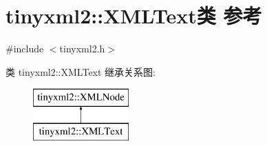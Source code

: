 \hypertarget{classtinyxml2_1_1_x_m_l_text}{}\section{tinyxml2\+:\+:X\+M\+L\+Text类 参考}
\label{classtinyxml2_1_1_x_m_l_text}


{\ttfamily \#include $<$tinyxml2.\+h$>$}

类 tinyxml2\+:\+:X\+M\+L\+Text 继承关系图\+:\begin{figure}[H]
\begin{center}
\leavevmode
\includegraphics[height=2.000000cm]{classtinyxml2_1_1_x_m_l_text}
\end{center}
\end{figure}

